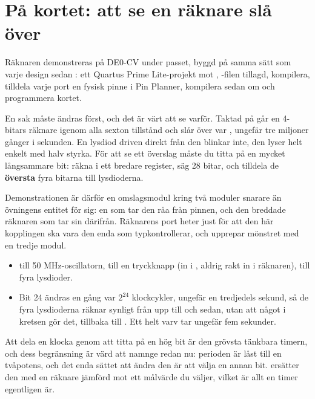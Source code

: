 \section{På kortet: att se en räknare slå över}
\label{c6:sec:counterdemo}

Räknaren demonstreras på DE0-CV under passet, byggd på samma sätt som varje design sedan
: ett Quartus Prime Lite-projekt mot , -filen tillagd,
kompilera, tilldela varje port en fysisk pinne i Pin Planner, kompilera sedan om och programmera
kortet.

En sak måste ändras först, och det är värt att se varför. Taktad på  går en 4-bitars
räknare igenom alla sexton tillstånd och slår över var , ungefär tre miljoner gånger i
sekunden. En lysdiod driven direkt från den blinkar inte, den lyser helt enkelt med halv styrka. För
att se ett överslag måste du titta på en mycket långsammare bit: räkna i ett bredare register, säg
28 bitar, och tilldela de \textbf{översta} fyra bitarna till lysdioderna.

Demonstrationen är därför en omslagsmodul kring två moduler snarare än övningens entitet för sig:
en  som tar den råa  från pinnen, och den breddade räknaren som tar
sin  därifrån. Räknarens port heter  just för att den här
kopplingen ska vara den enda som typkontrollerar, och  upprepar mönstret
med en tredje modul.

\begin{itemize}
  \item {} till 50 MHz-oscillatorn,  till en tryckknapp (in i
    , aldrig rakt in i räknaren),  till fyra lysdioder.
  \item Bit 24 ändras en gång var $2^{24}$ klockcykler, ungefär en tredjedels sekund, så de fyra
    lysdioderna räknar synligt från  upp till  och sedan, utan att något i
    kretsen gör det, tillbaka till . Ett helt varv tar ungefär fem sekunder.
\end{itemize}

Att dela en klocka genom att titta på en hög bit är den grövsta tänkbara timern, och dess
begränsning är värd att namnge redan nu: perioden är låst till en tvåpotens, och det enda sättet
att ändra den är att välja en annan bit.  ersätter den med en räknare jämförd mot
ett målvärde du väljer, vilket är allt en timer egentligen är.

